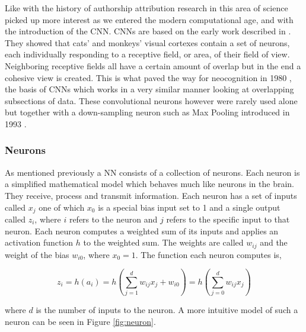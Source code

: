 Like with the history of authorship attribution research in this area of science
picked up more interest as we entered the modern computational age, and with
the introduction of the \gls{CNN}. \glspl{CNN} are based on the early work
described in \citet{TJP:TJP19681951215}. They showed that cats' and monkeys'
visual cortexes contain a set of neurons, each individually responding to a
receptive field, or area, of their field of view. Neighboring receptive fields
all have a certain amount of overlap but in the end a cohesive view is created.
This is what paved the way for neocognition in 1980 \citep{Fukushima1980}, the
basis of \glspl{CNN} which works in a very similar manner looking at overlapping
subsections of data. These convolutional neurons however were rarely used alone
but together with a down-sampling neuron such as Max Pooling introduced in 1993
\citep{Schmidhuber:2015}.


\subsubsection{Neurons}\label{sec:neurons}

As mentioned previously a \gls{NN} consists of a collection of neurons. Each
neuron is a simplified mathematical model which behaves much like neurons in the
brain. They receive, process and transmit information. Each neuron has a set of
inputs called $x_{j}$ one of which $x_{0}$ is a special bias input set to 1 and
a single output called $z_i$, where $i$ refers to the neuron and $j$ refers to
the specific input to that neuron. Each neuron computes a weighted sum of its
inputs and applies an activation function $h$ to the weighted sum. The weights
are called $w_{ij}$ and the weight of the bias $w_{i0}$, where $x_0 = 1$. The
function each neuron computes is,

\begin{equation}\label{eq:neuron}
    z_i = h(a_i) = h\left(
        \sum_{j = 1}^d w_{ij}x_j + w_{i0}
 \right) = h\left(
        \sum_{j = 0}^d w_{ij}x_j \right)
\end{equation}

where $d$ is the number of inputs to the neuron. A more intuitive model of such
a neuron can be seen in Figure \ref{fig:neuron}.


